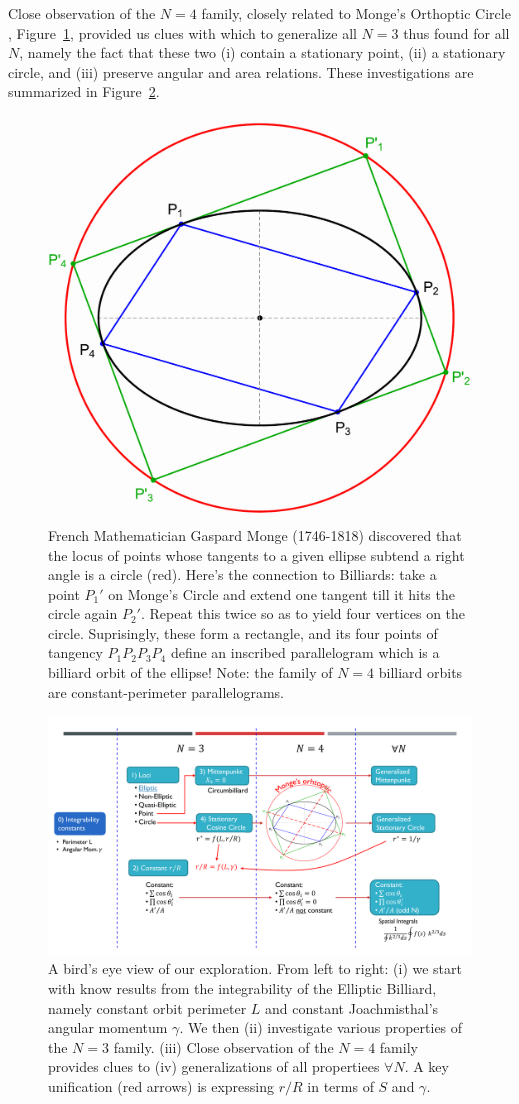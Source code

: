 Close observation of the $N=4$ family, closely related to Monge's Orthoptic Circle \cite{connes07}, Figure~\ref{fig:monge-orthoptic}, provided us clues with which to generalize all $N=3$ thus found for all $N$, namely the fact that these two (i) contain a stationary point, (ii) a stationary circle, and (iii) preserve angular and area relations. These investigations are summarized in Figure~\ref{fig:global-diagram}.

\begin{figure}[H]
    \centering
    \includegraphics[width=.4\textwidth]{pics/0200_monge_orthoptic.pdf}
    \caption{French Mathematician Gaspard Monge (1746-1818) discovered that the locus of points whose tangents to a given ellipse subtend a right angle is a circle (red). Here's the connection to Billiards: take a point $P_1'$ on Monge's Circle and extend one tangent till it hits the circle again $P_2'$. Repeat this twice so as to yield four vertices on the circle. Suprisingly, these form a rectangle, and its four points of tangency $P_1P_2P_3P_4$ define an inscribed parallelogram  which is a billiard orbit of the ellipse! Note: the family of $N=4$ billiard orbits are constant-perimeter parallelograms.}
    \label{fig:monge-orthoptic}
\end{figure}

\begin{figure}[H]
    \centering
    \includegraphics[width=\textwidth]{pics/0002_diagram_slide.pdf}
    \caption{A bird's eye view of our exploration. From left to right: (i) we start with know results from the integrability of the Elliptic Billiard, namely constant orbit perimeter $L$ and constant Joachmisthal's angular momentum $\gamma$. We then (ii) investigate various properties of the $N=3$ family. (iii) Close observation of the $N=4$ family provides clues to (iv) generalizations of all propertiees $\forall{N}$. A key unification (red arrows) is expressing $r/R$ in terms of $S$ and $\gamma$.}
    \label{fig:global-diagram}
\end{figure}

